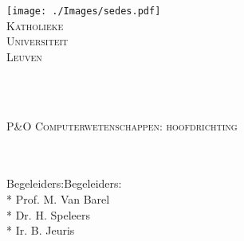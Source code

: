\begin{titlepage}

\begin{center}


\begin{flushright}

\begin{minipage}{0.15\textwidth}
\begin{center}
\texttt{[image: ./Images/sedes.pdf]}\\[0.1cm]
\tiny{\textsc{Katholieke\\
Universiteit\\
Leuven}}
\end{center}
\end{minipage}\\[2cm]

\end{flushright}  



\HRule \\[0.4cm]
{\huge \textsc{ P\&O Computerwetenschappen: hoofdrichting\\
\vspace{6mm}
\thetitle}}\\[0.4cm]

\HRule \\[1.5cm]


{
\Large
\theauthor
}

\vfill

{\large 
Begeleiders:Begeleiders:\\*
	Prof. M. Van Barel\\*
	Dr. H. Speleers\\*
	Ir. B. Jeuris
}

\end{center}

\end{titlepage}
